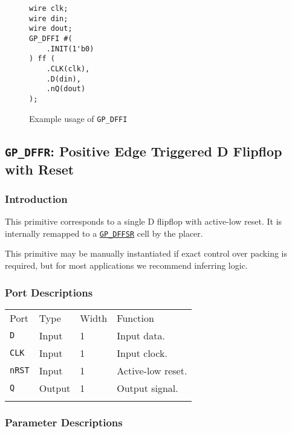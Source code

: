 \documentclass[11pt]{article}
\newcommand{\tokenstyle}[1]{\texttt{#1}}
\newcommand{\whenstyle}[1]{{\fontseries{sb}\selectfont#1}}
\newcommand{\tokenref}[2]{\hyperref[#2]{\tokenstyle{#1}}}
\newcommand{\thinhline}{\Xhline{1\arrayrulewidth}}
\newcommand{\thickhline}{\Xhline{2.5\arrayrulewidth}}
\begin{document}
\begin{figure}[h]
\begin{lstlisting}
wire clk;
wire din;
wire dout;
GP_DFFI #(
	.INIT(1'b0)
) ff (
	.CLK(clk),
	.D(din),
	.nQ(dout)
);
\end{lstlisting}
\caption{Example usage of \tokenstyle{GP\_DFFI}}
\label{gp-dffi-example}
\end{figure}


\pagebreak
\subsection{\tokenstyle{GP\_DFFR}: Positive Edge Triggered D Flipflop with Reset}
\label{gp-dffr}

\subsubsection{Introduction}
This primitive corresponds to a single D flipflop with active-low reset. It is internally remapped to a
\tokenref{GP\_DFFSR}{gp-dffsr} cell by the placer.

This primitive may be manually instantiated if exact control over packing is required, but for most applications we
recommend inferring logic.

\subsubsection{Port Descriptions}

\begin{tabularx}{\textwidth}{lllX}
\thinhline
\whenstyle{Port} & \whenstyle{Type} & \whenstyle{Width} & \whenstyle{Function} \\
\thickhline
\tokenstyle{D} & Input & 1 & Input data. \\
\thinhline
\tokenstyle{CLK} & Input & 1 & Input clock. \\
\thinhline
\tokenstyle{nRST} & Input & 1 & Active-low reset. \\
\thinhline
\tokenstyle{Q} & Output & 1 & Output signal. \\
\thinhline
\end{tabularx}

\subsubsection{Parameter Descriptions}
\end{document}
